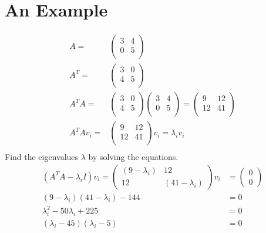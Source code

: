 \documentclass{article}
\begin{document}
\section{An Example }
\begin{align*}
    A=        & \begin{pmatrix}
        3 & 4 \\0&5\\
    \end{pmatrix}                                                    \\
    A^T=      & \begin{pmatrix}
        3 & 0 \\4&5\\
    \end{pmatrix}                                                    \\
    A^T A=    & \begin{pmatrix}
        3 & 0 \\4&5\\
    \end{pmatrix}\begin{pmatrix}
        3 & 4 \\0&5\\
    \end{pmatrix}=\begin{pmatrix}
        9 & 12 \\12&41\\
    \end{pmatrix} \\
    A^T Av_i= & \begin{pmatrix}
        9 & 12 \\12&41\\
    \end{pmatrix}v_i=\lambda_i  v_i                                  \\
\end{align*}
Find the eigenvalues $\lambda$ by solving the equations.
\begin{align*}
    (A^T A-\lambda_i I)v_i=\begin{pmatrix}
        (9-\lambda_i ) & 12 \\12 &(41-\lambda_i )
    \end{pmatrix}v_i & =  \begin{pmatrix}
        0 \\0
    \end{pmatrix}     \\
    (9-\lambda_i )(41-\lambda_i )-144                   & =                           0    \\
    \lambda_i ^2 -50\lambda_i +225                      & =                              0 \\
    (\lambda_i -45)(\lambda_i -5)                       & =0
\end{align*}
\end{document}
